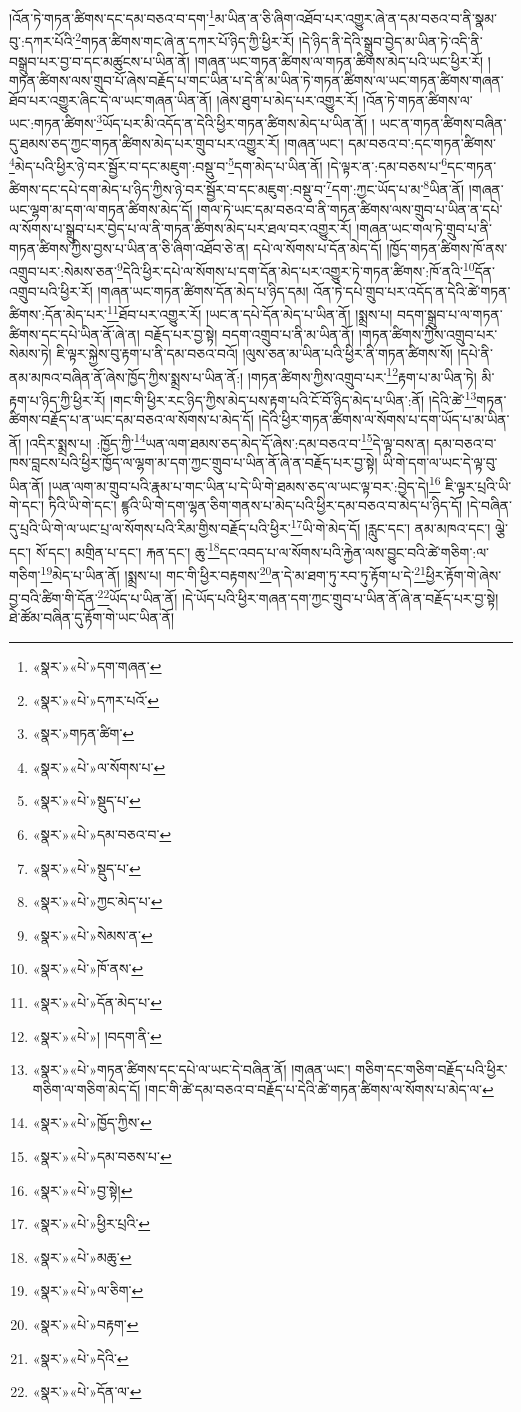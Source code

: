 །འོན་ཏེ་གཏན་ཚིགས་དང་དམ་བཅའ་བ་དག་\footnote{«སྣར་»«པེ་»དག་གཞན་}མ་ཡིན་ན་ཅི་ཞིག་འཐོབ་པར་འགྱུར་ཞེ་ན་དམ་བཅའ་བ་ནི་སྣམ་བུ་:དཀར་པོའི་\footnote{«སྣར་»«པེ་»དཀར་པའོ་}གཏན་ཚིགས་གང་ཞེ་ན་དཀར་པོ་ཉིད་ཀྱི་ཕྱིར་རོ། །དེ་ཉིད་ནི་དེའི་སྒྲུབ་བྱེད་མ་ཡིན་ཏེ་འདི་ནི་བསྒྲུབ་པར་བྱ་བ་དང་མཚུངས་པ་ཡིན་ནོ། །གཞན་ཡང་གཏན་ཚིགས་ལ་གཏན་ཚིགས་མེད་པའི་ཡང་ཕྱིར་རོ། །གཏན་ཚིགས་ལས་གྲུབ་པོ་ཞེས་བརྗོད་པ་གང་ཡིན་པ་དེ་ནི་མ་ཡིན་ཏེ་གཏན་ཚིགས་ལ་ཡང་གཏན་ཚིགས་གཞན་ཐོབ་པར་འགྱུར་ཞིང་དེ་ལ་ཡང་གཞན་ཡིན་ནོ། །ཞེས་ཐུག་པ་མེད་པར་འགྱུར་རོ། །འོན་ཏེ་གཏན་ཚིགས་ལ་ཡང་:གཏན་ཚིགས་\footnote{«སྣར་»གཏན་ཚིག་}ཡོད་པར་མི་འདོད་ན་དེའི་ཕྱིར་གཏན་ཚིགས་མེད་པ་ཡིན་ནོ། །
ཡང་ན་གཏན་ཚིགས་བཞིན་དུ་ཐམས་ཅད་ཀྱང་གཏན་ཚིགས་མེད་པར་གྲུབ་པར་འགྱུར་རོ། །གཞན་ཡང་། དམ་བཅའ་བ་:དང་གཏན་ཚིགས་\footnote{«སྣར་»«པེ་»ལ་སོགས་པ་}མེད་པའི་ཕྱིར་ཉེ་བར་སྦྱོར་བ་དང་མཇུག་:བསྡུ་བ་\footnote{«སྣར་»«པེ་»སྡུད་པ་}དག་མེད་པ་ཡིན་ནོ། །དེ་ལྟར་ན་:དམ་བཅས་པ་\footnote{«སྣར་»«པེ་»དམ་བཅའ་བ་}དང་གཏན་ཚིགས་དང་དཔེ་དག་མེད་པ་ཉིད་ཀྱིས་ཉེ་བར་སྦྱོར་བ་དང་མཇུག་:བསྡུ་བ་\footnote{«སྣར་»«པེ་»སྡུད་པ་}དག་:ཀྱང་ཡོད་པ་མ་\footnote{«སྣར་»«པེ་»ཀྱང་མེད་པ་}ཡིན་ནོ། །གཞན་ཡང་ལྷག་མ་དག་ལ་གཏན་ཚིགས་མེད་དོ། །གལ་ཏེ་ཡང་དམ་བཅའ་བ་ནི་གཏན་ཚིགས་ལས་གྲུབ་པ་ཡིན་ན་དཔེ་ལ་སོགས་པ་སྒྲུབ་པར་བྱེད་པ་ལ་ནི་གཏན་ཚིགས་མེད་པར་ཐལ་བར་འགྱུར་རོ། །གཞན་ཡང་གལ་ཏེ་གྲུབ་པ་ནི་གཏན་ཚིགས་ཀྱིས་བྱས་པ་ཡིན་ན་ཅི་ཞིག་འཐོབ་ཅེ་ན། དཔེ་ལ་སོགས་པ་དོན་མེད་དོ། །ཁྱོད་གཏན་ཚིགས་ཁོ་ནས་འགྲུབ་པར་:སེམས་ཅན་\footnote{«སྣར་»«པེ་»སེམས་ན་}དེའི་ཕྱིར་དཔེ་ལ་སོགས་པ་དག་དོན་མེད་པར་འགྱུར་ཏེ་གཏན་ཚིགས་:ཁོ་ནའི་\footnote{«སྣར་»«པེ་»ཁོ་ནས་}དོན་འགྲུབ་པའི་ཕྱིར་རོ། །གཞན་ཡང་གཏན་ཚིགས་དོན་མེད་པ་ཉིད་དམ། འོན་ཏེ་དཔེ་གྲུབ་པར་འདོད་ན་དེའི་ཚེ་གཏན་ཚིགས་:དོན་མེད་པར་\footnote{«སྣར་»«པེ་»དོན་མེད་པ་}ཐོབ་པར་འགྱུར་རོ། །ཡང་ན་དཔེ་དོན་མེད་པ་ཡིན་ནོ། །སྨྲས་པ། བདག་སྒྲུབ་པ་ལ་གཏན་ཚིགས་དང་དཔེ་ཡིན་ནོ་ཞེ་ན། བརྗོད་པར་བྱ་སྟེ། བདག་འགྲུབ་པ་ནི་མ་ཡིན་ནོ། །གཏན་ཚིགས་ཀྱིས་འགྲུབ་པར་སེམས་ཏེ། ཇི་ལྟར་སྐྱེས་བུ་རྟག་པ་ནི་དམ་བཅའ་བའོ། །ལུས་ཅན་མ་ཡིན་པའི་ཕྱིར་ནི་གཏན་ཚིགས་སོ། །དཔེ་ནི་ནམ་མཁའ་བཞིན་ནོ་ཞེས་ཁྱོད་ཀྱིས་སྨྲས་པ་ཡིན་ནོ:། །གཏན་ཚིགས་ཀྱིས་འགྲུབ་པར་\footnote{«སྣར་»«པེ་»། །བདག་ནི་}རྟག་པ་མ་ཡིན་ཏེ། མི་རྟག་པ་ཉིད་ཀྱི་ཕྱིར་རོ། །གང་གི་ཕྱིར་རང་ཉིད་ཀྱིས་མེད་པས་རྟག་པའི་ངོ་བོ་ཉིད་མེད་པ་ཡིན་:ནོ། །དེའི་ཚེ་\footnote{«སྣར་»«པེ་»གཏན་ཚིགས་དང་དཔེ་ལ་ཡང་དེ་བཞིན་ནོ། །གཞན་ཡང་། གཅིག་དང་གཅིག་བརྗོད་པའི་ཕྱིར་གཅིག་ལ་གཅིག་མེད་དོ། །གང་གི་ཚེ་དམ་བཅའ་བ་བརྗོད་པ་དེའི་ཚེ་གཏན་ཚིགས་ལ་སོགས་པ་མེད་ལ་}གཏན་ཚིགས་བརྗོད་པ་ན་ཡང་དམ་བཅའ་ལ་སོགས་པ་མེད་དོ། །དེའི་ཕྱིར་གཏན་ཚིགས་ལ་སོགས་པ་དག་ཡོད་པ་མ་ཡིན་ནོ། །འདིར་སྨྲས་པ། :ཁྱོད་ཀྱི་\footnote{«སྣར་»«པེ་»ཁྱོད་ཀྱིས་}ཡན་ལག་ཐམས་ཅད་མེད་དོ་ཞེས་:དམ་བཅའ་བ་\footnote{«སྣར་»«པེ་»དམ་བཅས་པ་}དེ་ལྟ་བས་ན། དམ་བཅའ་བ་ཁས་བླངས་པའི་ཕྱིར་ཁྱོད་ལ་ལྷག་མ་དག་ཀྱང་གྲུབ་པ་ཡིན་ནོ་ཞེ་ན་བརྗོད་པར་བྱ་སྟེ། ཡི་གེ་དག་ལ་ཡང་དེ་ལྟ་བུ་ཡིན་ནོ། །ཡན་ལག་མ་གྲུབ་པའི་རྣམ་པ་གང་ཡིན་པ་དེ་ཡི་གེ་ཐམས་ཅད་ལ་ཡང་ལྟ་བར་:བྱེད་དེ།\footnote{«སྣར་»«པེ་»བྱ་སྟེ།} ཇི་ལྟར་པྲའི་ཡི་གེ་དང་། ཏིའི་ཡི་གེ་དང་། ཛྙའི་ཡི་གེ་དག་ལྷན་ཅིག་གནས་པ་མེད་པའི་ཕྱིར་དམ་བཅའ་བ་མེད་པ་ཉིད་དོ། །དེ་བཞིན་དུ་པྲའི་ཡི་གེ་ལ་ཡང་པྲ་ལ་སོགས་པའི་རིམ་གྱིས་བརྗོད་པའི་ཕྱིར་\footnote{«སྣར་»«པེ་»ཕྱིར་པྲའི་}ཡི་གེ་མེད་དོ། །རླུང་དང་། ནམ་མཁའ་དང་། ལྕེ་དང་། སོ་དང་། མགྲིན་པ་དང་། རྐན་དང་། ཆུ་\footnote{«སྣར་»«པེ་»མཆུ་}དང་འབད་པ་ལ་སོགས་པའི་རྐྱེན་ལས་བྱུང་བའི་ཚེ་གཅིག་:ལ་གཅིག་\footnote{«སྣར་»«པེ་»ལ་ཅིག་}མེད་པ་ཡིན་ནོ། །སྨྲས་པ། གང་གི་ཕྱིར་བརྟགས་\footnote{«སྣར་»«པེ་»བརྟག་}ན་དེ་མ་ཐག་ཏུ་རབ་ཏུ་རྟོག་པ་དེ་\footnote{«སྣར་»«པེ་»དེའི་}ཕྱིར་རྟོག་གེ་ཞེས་བྱ་བའི་ཚིག་གི་དོན་\footnote{«སྣར་»«པེ་»དོན་ལ་}ཡོད་པ་ཡིན་ནོ། །དེ་ཡོད་པའི་ཕྱིར་གཞན་དག་ཀྱང་གྲུབ་པ་ཡིན་ནོ་ཞེ་ན་བརྗོད་པར་བྱ་སྟེ། ཐེ་ཚོམ་བཞིན་དུ་རྟོག་གེ་ཡང་ཡིན་ནོ། 
